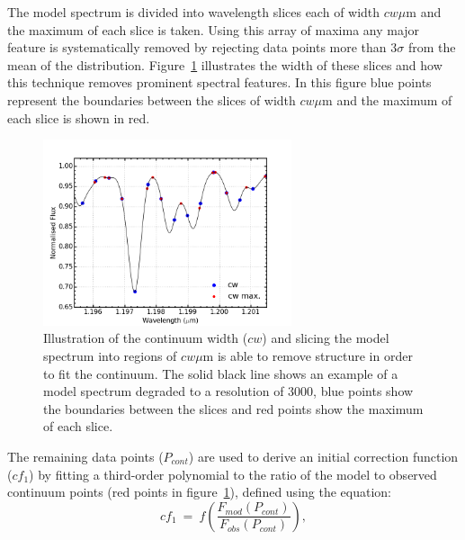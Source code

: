 
The model spectrum is divided into wavelength slices each of width $cw\mu$m and the maximum of each slice is taken.
Using this array of maxima any major feature is systematically removed by rejecting data points more than 3$\sigma$ from the mean of the distribution.
Figure~\ref{fig:cw} illustrates the width of these slices and how this technique  removes prominent spectral features.
In this figure blue points represent the boundaries between the slices of width $cw\mu$m and the maximum of each slice is shown in red.

\begin{figure}
 \centering
\includegraphics[width=0.65\textwidth]{JAnal/cw}
\caption[Illustration of continuum width slices and maxima]{
Illustration of the continuum width ($cw$) and slicing the model spectrum into regions of $cw\mu$m is able to remove structure in order to fit the continuum.
The solid black line shows an example of a model spectrum degraded to a resolution of 3000,
blue points show the boundaries between the slices and red points show the maximum of each slice.\label{fig:cw}
         }
\end{figure}


The remaining data points ($P_{cont}$) are used to derive an initial correction function
($cf_{1}$) by fitting a third-order polynomial to the ratio of the model to observed continuum points (red points in figure~\ref{fig:cw}), defined using the equation:
\begin{equation}
    cf_{1}~=~f(\frac{F_{mod}(P_{cont})}{F_{obs}(P_{cont})}),
\end{equation}

